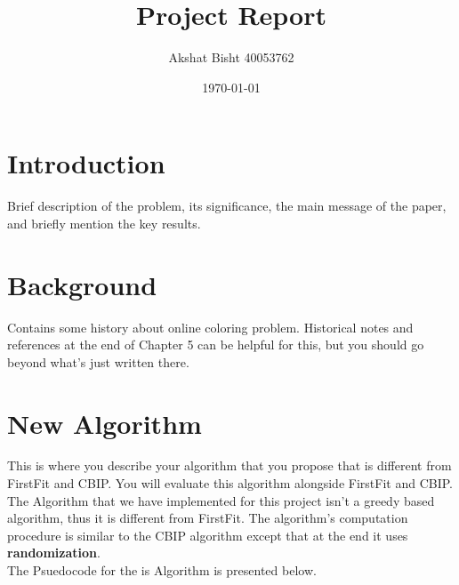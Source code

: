 \documentclass{article}
\begin{document}
\title{Project Report}
\author{Akshat Bisht 40053762}
\date{\today}
\maketitle

\newpage


\section{Introduction}
Brief description of the problem, its significance, the main message of the paper, and briefly mention the key results.

\section{Background} 
Contains some history about online coloring problem. Historical notes and references at the end of Chapter 5 can be helpful 
for this, but you should go beyond what's just written there.

\newpage

\section{New Algorithm}

This is where you describe your algorithm that you propose that is different from FirstFit and CBIP. You will evaluate this 
algorithm alongside FirstFit and CBIP.
\bigbreak
The Algorithm that we have implemented for this project isn't a greedy based algorithm, thus it is different from FirstFit. The algorithm's
computation procedure is similar to the CBIP algorithm except that at the end it uses \textbf{randomization}.\\
The Psuedocode for the is Algorithm is presented below.
		
\end{document}
